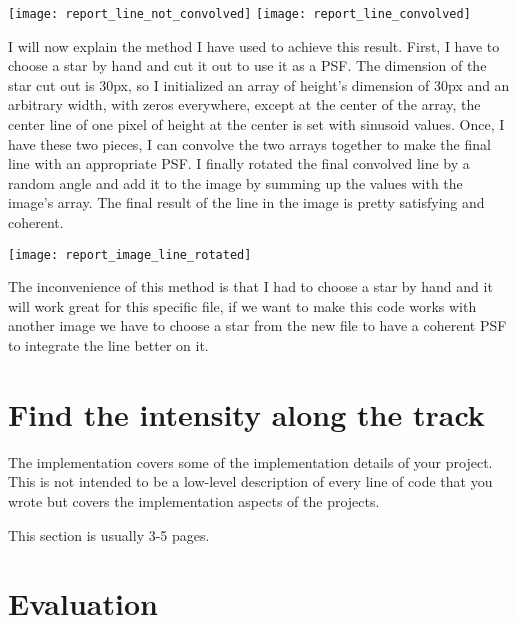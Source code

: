 \documentclass[a4paper,12pt,oneside]{report}
\begin{document}

\begin{center}
    \texttt{[image: report\_line\_not\_convolved]}
    \label{lineNotConvolved}
    \texttt{[image: report\_line\_convolved]}
    \label{lineConvolved}
\end{center}

I will now explain the method I have used to achieve this result. First, I have to choose a star by hand and cut it out to use it as a PSF.
The dimension of the star cut out is 30px, so I initialized an array of height's dimension of 30px and an arbitrary width, with zeros everywhere,
except at the center of the array, the center line of one pixel of height at the center is set with sinusoid values. Once, I have these two pieces,
I can convolve the two arrays together to make the final line with an appropriate PSF. I finally rotated the final convolved line by a random angle
and add it to the image by summing up the values with the image's array. The final result of the line in the image is pretty satisfying and coherent.
\begin{center}
    \texttt{[image: report\_image\_line\_rotated]}
    \label{lineOnImage}
\end{center}
The inconvenience of this method is that I had to choose a star by hand and it will work great for this specific file, if we want to make this code 
works with another image we have to choose a star from the new file to have a coherent PSF to integrate the line better on it.


\chapter{Find the intensity along the track}

The implementation covers some of the implementation details of your project.
This is not intended to be a low-level description of every line of code that
you wrote but covers the implementation aspects of the projects.

This section is usually 3-5 pages.


\chapter{Evaluation}
\end{document}
